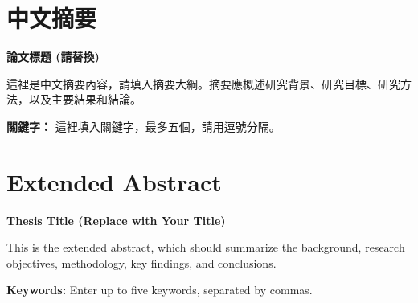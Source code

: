 \documentclass[a4paper,12pt]{report}
\begin{document}
\chapter*{\centering 中文摘要}
\begin{center}
  {\Large \textbf{論文標題 (請替換)}} %
\end{center}
\vspace{1cm}

這裡是中文摘要內容，請填入摘要大綱。摘要應概述研究背景、研究目標、研究方法，以及主要結果和結論。

\vspace{1cm}

\noindent \textbf{關鍵字：} 這裡填入關鍵字，最多五個，請用逗號分隔。

\newpage

\chapter*{\centering Extended Abstract}
\begin{center}
  {\Large \textbf{Thesis Title (Replace with Your Title)}} %
\end{center}
\vspace{1cm}

This is the extended abstract, which should summarize the background, research objectives, methodology, key findings, and conclusions.

\vspace{1cm}

\noindent \textbf{Keywords:} Enter up to five keywords, separated by commas.
\end{document}
